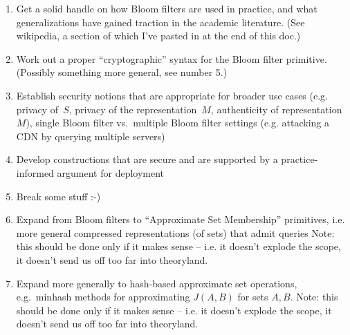 \begin{enumerate}
\item Get a solid handle on how Bloom filters are used in practice, and what generalizations have gained traction in the academic literature. (See wikipedia, a section of which I've pasted in at the end of this doc.) 
\item Work out a proper “cryptographic” syntax for the Bloom filter primitive.  (Possibly something more general, see number 5.)
\item Establish security notions that are appropriate for broader use cases (e.g. privacy of~$S$, privacy of the representation~$M$, authenticity of representation~$M$), single Bloom filter vs.\ multiple Bloom filter settings (e.g. attacking a CDN by querying multiple servers)
\item Develop constructions that are secure and are supported by a practice-informed argument for deployment
\item Break some stuff :-)
\item Expand from Bloom filters to “Approximate Set Membership” primitives, i.e. more general compressed representations (of sets) that admit queries  Note: this should be done only if it makes sense -- i.e. it doesn't explode the scope, it doesn't send us off too far into theoryland.
\item Expand more generally to hash-based approximate set operations, e.g.\ minhash methods for approximating $J(A,B)$ for sets $A,B$.  Note: this should be done only if it makes sense -- i.e. it doesn't explode the scope, it doesn't send us off too far into theoryland.
\end{enumerate}

